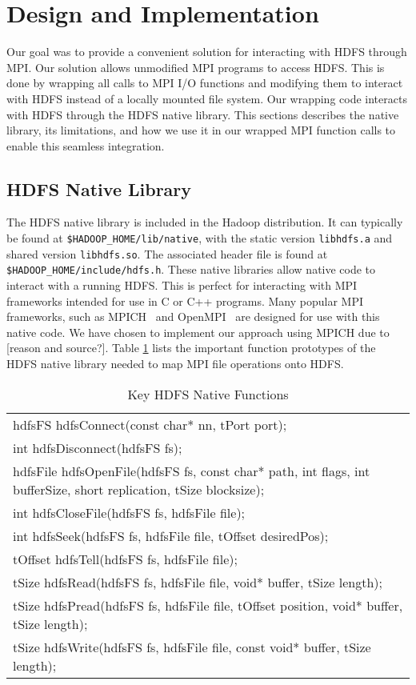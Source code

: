 \section{Design and Implementation}
\label{sec:impl}
Our goal was to provide a convenient solution for interacting with HDFS through MPI. Our solution allows unmodified MPI programs to access HDFS. This is done by wrapping all calls to MPI I/O functions and modifying them to interact with HDFS instead of a locally mounted file system. Our wrapping code interacts with HDFS through the HDFS native library. This sections describes the native library, its limitations, and how we use it in our wrapped MPI function calls to enable this seamless integration.

\subsection{HDFS Native Library}
The HDFS native library is included in the Hadoop distribution. It can typically be found at \texttt{\$HADOOP\_HOME/lib/native}, with the static version \texttt{libhdfs.a} and shared version \texttt{libhdfs.so}. The associated header file is found at \texttt{\$HADOOP\_HOME/include/hdfs.h}. These native libraries allow native code to interact with a running HDFS. This is perfect for interacting with MPI frameworks intended for use in C or C++ programs. Many popular MPI frameworks, such as MPICH~\cite{mpich} and OpenMPI~\cite{openmpi} are designed for use with this native code. We have chosen to implement our approach using MPICH due to [reason and source?]. Table \ref{table:libhdfs} lists the important function prototypes of the HDFS native library needed to map MPI file operations onto HDFS.

\begin{table}[ht]
\caption{Key HDFS Native Functions}
{\ttfamily
\begin{tabular}{l}
\hline\hline
hdfsFS hdfsConnect(const char* nn, tPort port); \\
int hdfsDisconnect(hdfsFS fs); \\
hdfsFile hdfsOpenFile(hdfsFS fs, const char* path, int flags,
                          int bufferSize, short replication, tSize blocksize); \\
int hdfsCloseFile(hdfsFS fs, hdfsFile file); \\
int hdfsSeek(hdfsFS fs, hdfsFile file, tOffset desiredPos); \\
tOffset hdfsTell(hdfsFS fs, hdfsFile file); \\
tSize hdfsRead(hdfsFS fs, hdfsFile file, void* buffer, tSize length); \\
tSize hdfsPread(hdfsFS fs, hdfsFile file, tOffset position,
                    void* buffer, tSize length); \\
tSize hdfsWrite(hdfsFS fs, hdfsFile file, const void* buffer,
                    tSize length); \\
\hline\hline
\end{tabular}
}
\label{table:libhdfs}
\end{table}
					
